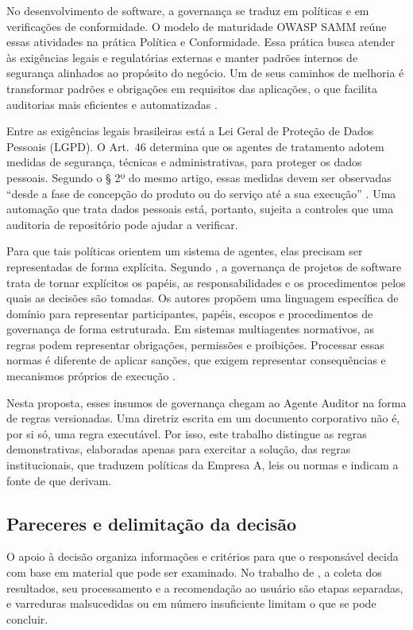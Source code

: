 No desenvolvimento de software, a governança se traduz em políticas e em verificações de conformidade. O modelo de maturidade OWASP SAMM reúne essas atividades na prática Política e Conformidade. Essa prática busca atender às exigências legais e regulatórias externas e manter padrões internos de segurança alinhados ao propósito do negócio. Um de seus caminhos de melhoria é transformar padrões e obrigações em requisitos das aplicações, o que facilita auditorias mais eficientes e automatizadas \cite{owaspSamm}.

Entre as exigências legais brasileiras está a Lei Geral de Proteção de Dados Pessoais (LGPD). O Art.~46 determina que os agentes de tratamento adotem medidas de segurança, técnicas e administrativas, para proteger os dados pessoais. Segundo o § 2º do mesmo artigo, essas medidas devem ser observadas ``desde a fase de concepção do produto ou do serviço até a sua execução'' \cite{lgpd2018}. Uma automação que trata dados pessoais está, portanto, sujeita a controles que uma auditoria de repositório pode ajudar a verificar.

Para que tais políticas orientem um sistema de agentes, elas precisam ser representadas de forma explícita. Segundo , a governança de projetos de software trata de tornar explícitos os papéis, as responsabilidades e os procedimentos pelos quais as decisões são tomadas. Os autores propõem uma linguagem específica de domínio para representar participantes, papéis, escopos e procedimentos de governança de forma estruturada. Em sistemas multiagentes normativos, as regras podem representar obrigações, permissões e proibições. Processar essas normas é diferente de aplicar sanções, que exigem representar consequências e mecanismos próprios de execução \cite{yan2025}.

Nesta proposta, esses insumos de governança chegam ao Agente Auditor na forma de regras versionadas. Uma diretriz escrita em um documento corporativo não é, por si só, uma regra executável. Por isso, este trabalho distingue as regras demonstrativas, elaboradas apenas para exercitar a solução, das regras institucionais, que traduzem políticas da Empresa A, leis ou normas e indicam a fonte de que derivam.

\subsection{Pareceres e delimitação da decisão}
\label{rt-2-5-2}

O apoio à decisão organiza informações e critérios para que o responsável decida com base em material que pode ser examinado. No trabalho de , a coleta dos resultados, seu processamento e a recomendação ao usuário são etapas separadas, e varreduras malsucedidas ou em número insuficiente limitam o que se pode concluir.

